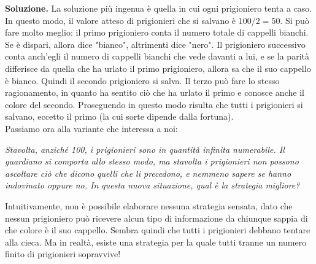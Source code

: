 \documentclass[12pt,a4paper]{report}
\theoremstyle{definition}
\theoremstyle{num.custom-title}
\begin{document}
\noindent\textbf{Soluzione.} La soluzione più ingenua è quella in cui ogni prigioniero tenta a caso. In questo modo, il valore atteso di prigionieri che si salvano è $100/2=50$. Si può fare molto meglio: il primo prigioniero conta il numero totale di cappelli bianchi. Se è dispari, allora dice "bianco", altrimenti dice "nero". Il prigioniero successivo conta anch'egli il numero di cappelli bianchi che vede davanti a lui, e se la parità differisce da quella che ha urlato il primo prigioniero, allora sa che il suo cappello è bianco. Quindi il secondo prigioniero si salva. Il terzo può fare lo stesso ragionamento, in quanto ha sentito ciò che ha urlato il primo e conosce anche il colore del secondo. Proseguendo in questo modo risulta che tutti i prigionieri si salvano, eccetto il primo (la cui sorte dipende dalla fortuna).\\

Passiamo ora alla variante che interessa a noi: 

\begin{flushleft}
\emph{Stavolta, anziché 100, i prigionieri sono in quantità infinita numerabile. Il guardiano si comporta allo stesso modo, ma stavolta i prigionieri non possono ascoltare ciò che dicono quelli che li precedono, e nemmeno sapere se hanno indovinato oppure no. In questa nuova situazione, qual è la strategia migliore?}
\end{flushleft}

Intuitivamente, non è possibile elaborare nessuna strategia sensata, dato che nessun prigioniero può ricevere alcun tipo di informazione da chiunque sappia di che colore è il suo cappello. Sembra quindi che tutti i prigionieri debbano tentare alla cieca. Ma in realtà, esiste una strategia per la quale tutti tranne un numero finito di prigionieri sopravvive!\\
\end{document}
